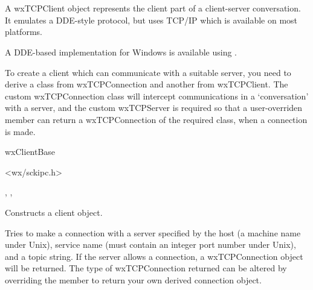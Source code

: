 \section{}\label{wxtcpclient}

A wxTCPClient object represents the client part of a client-server conversation.
It emulates a DDE-style protocol, but uses TCP/IP which is available on most platforms.

A DDE-based implementation for Windows is available using .

To create a client which can communicate with a suitable server,
you need to derive a class from wxTCPConnection and another from wxTCPClient.
The custom wxTCPConnection class will intercept communications in
a `conversation' with a server, and the custom wxTCPServer is required
so that a user-overriden  member can return
a wxTCPConnection of the required class, when a connection is made.


wxClientBase\\


<wx/sckipc.h>


, , 




Constructs a client object.

\label{wxtcpclientmakeconnection}


Tries to make a connection with a server specified by the host
(a machine name under Unix), service name (must
contain an integer port number under Unix), and a topic string. If the
server allows a connection, a wxTCPConnection object will be returned.
The type of wxTCPConnection returned can be altered by overriding
the  member to return your own
derived connection object.

